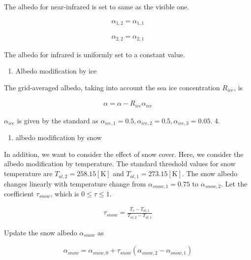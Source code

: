 The albedo for near-infrared is set to same as the visible one.

\begin{eqnarray}
    \alpha_{1,2} =\alpha_{1,1}
\end{eqnarray}

\begin{eqnarray}
    \alpha_{2,2} =\alpha_{2,1}
\end{eqnarray}

The albedo for infrared is uniformly set to a constant value.

\begin{enumerate}
\def\labelenumi{\arabic{enumi}.}
\setcounter{enumi}{2}
\tightlist
\item
  Albedo modification by ice
\end{enumerate}

The grid-averaged albedo, taking into account the sea ice concentration
\(R_{ice}\), is

\begin{eqnarray}
    \alpha = \alpha -R_{ice} \alpha_{ice}
\end{eqnarray}

\(\alpha_{ice}\) is given by the standard as
\(\alpha_{ice,1}=0.5,\alpha_{ice,2}=0.5,\alpha_{ice,3}=0.05\). 4.

\begin{enumerate}
\def\labelenumi{\arabic{enumi}.}
\setcounter{enumi}{3}
\tightlist
\item
  albedo modification by snow
\end{enumerate}

In addition, we want to consider the effect of snow cover. Here, we
consider the albedo modification by temperature. The standard threshold
values for snow temperature are \(T_{al,2}=258.15 \mathrm{[K]}\) and
\(T_{al,1}=273.15 \mathrm{[K]}\). The snow albedo changes linearly with
temperature change from \(\alpha_{snow,1}=0.75\) to
\(\alpha_{ snow,2}\). Let the coefficient \(\tau_{snow}\), which is
\(0\le \tau \le 1\).

\begin{eqnarray}
\tau_{snow} = \frac{T_s - T_{al,1}}{T_{al,2}-T_{al,1}}
\end{eqnarray}

Update the snow albedo \(\alpha_{snow}\) as

\begin{eqnarray}
    \alpha_{snow} = \alpha_{snow,0} + \tau_{snow}(\alpha_{snow,2}-\alpha_{snow,1})
\end{eqnarray}

